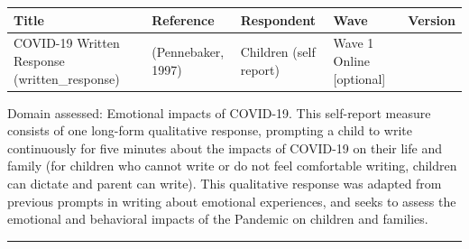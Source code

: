 \documentclass[
]{book}
\begin{document}
\begin{longtable}[]{@{}lllll@{}}
\toprule
\begin{minipage}[b]{0.23\columnwidth}\raggedright
Title\strut
\end{minipage} & \begin{minipage}[b]{0.20\columnwidth}\raggedright
Reference\strut
\end{minipage} & \begin{minipage}[b]{0.21\columnwidth}\raggedright
Respondent\strut
\end{minipage} & \begin{minipage}[b]{0.08\columnwidth}\raggedright
Wave\strut
\end{minipage} & \begin{minipage}[b]{0.14\columnwidth}\raggedright
Version\strut
\end{minipage}\tabularnewline
\midrule
\endhead
\begin{minipage}[t]{0.23\columnwidth}\raggedright
COVID-19 Written Response (written\_response)\strut
\end{minipage} & \begin{minipage}[t]{0.20\columnwidth}\raggedright
(Pennebaker, 1997)\strut
\end{minipage} & \begin{minipage}[t]{0.21\columnwidth}\raggedright
Children (self report)\strut
\end{minipage} & \begin{minipage}[t]{0.08\columnwidth}\raggedright
Wave 1 Online {[}optional{]}\strut
\end{minipage} & \begin{minipage}[t]{0.14\columnwidth}\raggedright
\strut
\end{minipage}\tabularnewline
\bottomrule
\end{longtable}

Domain assessed: Emotional impacts of COVID-19. This self-report measure consists of one long-form qualitative response, prompting a child to write continuously for five minutes about the impacts of COVID-19 on their life and family (for children who cannot write or do not feel comfortable writing, children can dictate and parent can write). This qualitative response was adapted from previous prompts in writing about emotional experiences, and seeks to assess the emotional and behavioral impacts of the Pandemic on children and families.

\begin{center}\rule{0.5\linewidth}{0.5pt}\end{center}
\end{document}
